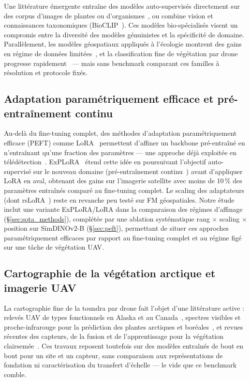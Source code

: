 \documentclass[11pt,a4paper]{article}
\begin{document}
Une littérature émergente entraîne des modèles auto-supervisés directement sur des corpus d'images de plantes ou d'organismes~\autocite{moummad2026selfsupervised,gustineli2024multilabel,goeau2025overview}, ou combine vision et connaissances taxonomiques (BioCLIP~\autocite{stevens2024bioclip}). Ces modèles bio-spécialisés visent un compromis entre la diversité des modèles génuinistes et la spécificité de domaine. Parallèlement, les modèles géospatiaux appliqués à l'écologie montrent des gains en régime de données limitées~\autocite{ball2026geospatial,doherty2024leveraging}, et la classification fine de végétation par drone progresse rapidement~\autocite{yuan2026treespecvit,kulich2026advancing} — mais sans benchmark comparant ces familles à résolution et protocole fixés.

\subsection{Adaptation paramétriquement efficace et pré-entraînement continu}

Au-delà du fine-tuning complet, des méthodes d'adaptation paramétriquement efficace (PEFT) comme LoRA~\autocite{hu2021lora} permettent d'affiner un backbone pré-entraîné en n'entraînant qu'une fraction des paramètres — une approche déjà exploitée en télédétection~\autocite{dong2025peftcd}. ExPLoRA~\autocite{zhang2025explora} étend cette idée en poursuivant l'objectif auto-supervisé sur le nouveau domaine (pré-entraînement continu~\autocite{mendieta2023geospatial}) avant d'appliquer LoRA en aval, obtenant des gains sur l'imagerie satellite avec moins de 10\,\% des paramètres entraînés comparé au fine-tuning complet. Le scaling des adaptateurs (dont rsLoRA~\autocite{kalajdzievski2023rslora}) reste en revanche peu testé sur FM géospatiales. Notre étude inclut une variante ExPLoRA/LoRA dans la comparaison des régimes d'affinage (\S\ref{sec:sota_methods}), complétée par une ablation systématique rang $\times$ scaling $\times$ position sur SimDINOv2-B (\S\ref{sec:peft}), permettant de situer ces approches paramétriquement efficaces par rapport au fine-tuning complet et au régime figé sur une tâche de végétation UAV.

\subsection{Cartographie de la végétation arctique et imagerie UAV}

La cartographie fine de la toundra par drone fait l'objet d'une littérature active : relevés UAV de types fonctionnels en Alaska et au Canada~\autocite{orndahl2022mapping}, spectres visibles et proche-infrarouge pour la prédiction des plantes arctiques et boréales~\autocite{nelson2024predicting}, et revues récentes des capteurs, de la fusion et de l'apprentissage pour la végétation clairsemée~\autocite{yang2022remote,platel2025advancing}. Ces travaux reposent toutefois sur des modèles entraînés de bout en bout pour un site et un capteur, sans comparaison aux représentations de fondation ni caractérisation du transfert d'échelle — le vide que ce benchmark comble.
\end{document}
